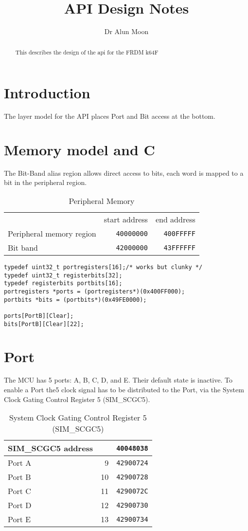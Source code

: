 \documentclass{tufte-handout}
\title{API Design Notes}
\author{Dr Alun Moon}
\begin{document}
\maketitle
\begin{abstract}
This describes the design of the api for the
FRDM k64F
\end{abstract}
\section{Introduction}
The layer model for the API places Port and Bit access at the
bottom.

\section{Memory model and C}
The Bit-Band alias region allows direct access to bits, each word is mapped to a bit in the peripheral region.

\begin{table}
    \caption{Peripheral Memory }
    \label{}
    \begin{tabular}{lrr}
        & start address & end address \\
Peripheral memory region  & \texttt{40000000} & \texttt{400FFFFF} \\
Bit band   & \texttt{42000000} & \texttt{43FFFFFF} \\
    \end{tabular}
\end{table}
\begin{verbatim}
typedef uint32_t portregisters[16];/* works but clunky */
typedef uint32_t registerbits[32];
typedef registerbits portbits[16];
portregisters *ports = (portregisters*)(0x400FF000);
portbits *bits = (portbits*)(0x49FE0000);

ports[PortB][Clear];
bits[PortB][Clear][22];
\end{verbatim}

\section{Port}
The MCU has 5 ports: A, B, C, D, and E.  Their default state is inactive.
To enable a Port the5 clock signal has to be distributed to the Port,
via the System Clock Gating Control Register 5 (SIM\_SCGC5).

\begin{table}
    \caption{System Clock Gating Control Register 5 (SIM\_SCGC5)}
    \label{simscgc5}
    \begin{tabular}{lrr}
SIM\_SCGC5 address  && \texttt{40048038} \\  \midrule
Port A  & 9 &  \texttt{42900724} \\
Port B  & 10 & \texttt{42900728} \\
Port C  & 11 & \texttt{4290072C} \\
Port D  & 12 & \texttt{42900730} \\
Port E  & 13 & \texttt{42900734} \\
    \end{tabular}
\end{table}
\end{document}
